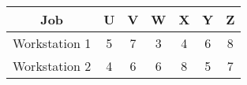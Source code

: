 \begin{table}[h!]
\centering
\begin{tabular}{|c|c|c|c|c|c|c|}
\hline
\textbf{Job} & \textbf{U} & \textbf{V} & \textbf{W} & \textbf{X} & \textbf{Y} & \textbf{Z} \\ \hline
Workstation 1 & 5 & 7 & 3 & 4 & 6 & 8 \\ \hline
Workstation 2 & 4 & 6 & 6 & 8 & 5 & 7 \\ \hline
\end{tabular}
\end{table}
